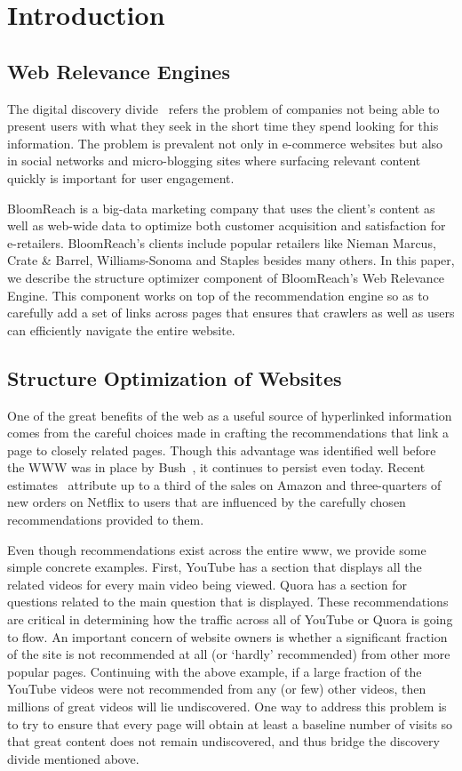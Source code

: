 \section{Introduction}

\subsection{Web Relevance Engines}
The digital discovery divide~\cite{WebRelevanceEngine} refers the problem of companies not being able to present users with what they seek in the short time they spend looking for this information.
The problem is prevalent not only in e-commerce websites but also in social networks and micro-blogging sites where surfacing relevant content quickly is important for user engagement. \vs

BloomReach is a big-data marketing company that uses the client's content as well as web-wide data to optimize both customer acquisition and satisfaction for e-retailers.
BloomReach's clients include popular retailers like Nieman Marcus, Crate \& Barrel, Williams-Sonoma and Staples besides many others. In this paper, we describe the structure optimizer component of BloomReach's Web Relevance Engine.
This component works on top of the recommendation engine so as to carefully add a set of links across pages that ensures that crawlers as well as users can efficiently navigate the entire website.

\subsection{Structure Optimization of Websites}

One of the great benefits of the web as a useful source of hyperlinked
information comes from the careful choices made in crafting the
recommendations that link a page to closely related pages. Though this
advantage was identified well before the WWW was in place by
Bush~\cite{Bush45aswe}, it continues to persist even today.
Recent estimates~\cite{big-data-book13} attribute up to a third of the sales
on Amazon and three-quarters of new orders on Netflix to users that are
influenced by the carefully chosen recommendations provided to them. \vs

Even though recommendations exist across the entire www, we provide some simple concrete examples. First, YouTube has a section that displays all the related videos for every main video being viewed.
Quora has a section for questions related to the main question that is displayed. These recommendations are critical in determining how the traffic across all of YouTube or Quora is going to flow.
An important concern of website owners is whether a significant fraction of the site is not recommended at all (or `hardly' recommended) from other more popular pages. Continuing
with the above example, if a large fraction of the YouTube videos were not recommended from any (or few) other videos, then millions of great videos will lie undiscovered. One way to address this
problem is to try to ensure that every page will obtain at least a baseline number of visits so that great content does not remain undiscovered, and thus bridge the discovery divide mentioned above. \vs

